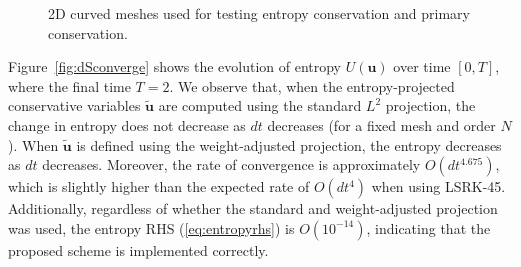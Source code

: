 \documentclass[preprint,10pt]{article}
\theoremstyle{definition}
\theoremstyle{lemma}
\theoremstyle{theorem}
\theoremstyle{assumption}
\renewcommand{\tilde}{\widetilde}
\begin{document}
{\begin{figure}
\centering
{}
\hspace{1em}
\caption{2D curved meshes used for testing entropy conservation and primary conservation.}
\label{fig:warp2d}
\end{figure}

Figure~\ref{fig:dSconverge} shows the evolution of entropy $U(\bm{u})$ over time $[0,T]$, where the final time $T = 2$.  We observe that, when the entropy-projected conservative variables $\tilde{\bm{u}}$ are computed using the standard $L^2$ projection, the change in entropy does not decrease as $dt$ decreases (for a fixed mesh and order $N$).  When $\tilde{\bm{u}}$ is defined using the weight-adjusted projection, the entropy decreases as $dt$ decreases.  Moreover, the rate of convergence is approximately $O(dt^{4.675})$, which is slightly higher than the expected rate of $O(dt^4)$ when using LSRK-45.  Additionally, regardless of whether the standard and weight-adjusted projection was used, the entropy RHS (\ref{eq:entropyrhs}) is $O(10^{-14})$, indicating that the proposed scheme is implemented correctly.  

\begin{figure}
\centering
{}
\end{figure}}
\end{document}
